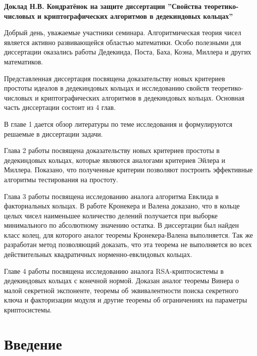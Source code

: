 \documentclass[12pt]{article}
\begin{document}
\begin{center}
\textbf{Доклад Н.В. Кондратёнок на защите диссертации ''Свойства теоретико-числовых и криптографических алгоритмов в дедекиндовых кольцах''}
\end{center}

Добрый день, уважаемые участники семинара.
Алгоритмическая теория чисел является активно развивающейся областью математики.
Особо полезными для диссертации оказались работы Дедекинда, Поста, Баха, Коэна, Миллера и других математиков.

Представленная диссертация посвящена доказательству новых критериев простоты идеалов в дедекиндовых кольцах и исследованию свойств теоретико-числовых и криптографических алгоритмов в дедекиндовых кольцах.
Основная часть диссертации состоит из 4 глав.

В главе 1 дается обзор литературы по теме исследования и формулируются решаемые в диссертации задачи.

Глава 2 работы посвящена доказательству новых критериев простоты в дедекиндовых кольцах, которые являются аналогами критериев Эйлера и Миллера.
Показано, что полученные критерии позволяют построить эффективные алгоритмы тестирования на простоту.

Глава 3 работы посвящена исследованию аналога алгоритма Евклида в факториальных кольцах.
В работе Кронекера и Валена доказано, что в кольце целых чисел наименьшее количество делений получается при выборке минимального по абсолютному значению остатка.
В диссертации был найден класс колец, для которого аналог теоремы Кронекера-Валена выполняется.
Так же разработан метод позволяющий доказать, что эта теорема не выполняется во всех действительных квадратичных норменно-евклидовых кольцах.
    
Главе 4 работы посвящена исследованию аналога RSA-криптосистемы в дедекиндовых кольцах с конечной нормой.
Доказан аналог теоремы Винера о малой секретной экспоненте, теоремы об эквивалентности поиска секретного ключа и факторизации модуля и другие теоремы об ограничениях на параметры криптосистемы.

\section{Введение}
\end{document}
